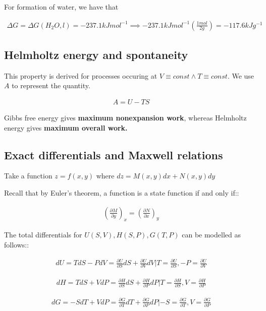\documentclass[12pt]{book}
\begin{document}
For formation of water, we have that

\begin{align*}
    \Delta G=\Delta G(H_2O,l)=-237.1kJmol^{-1}\implies -237.1kJmol^{-1}\left(\frac{1mol}{2g}\right)=-117.6kJg^{-1}
\end{align*}

\subsection*{Helmholtz energy and spontaneity}

This property is derived for processes occuring at $V\equiv const \land T\equiv const$. We use $A$ to represent the quantity.

\begin{align*}
    A=U-TS
\end{align*}

Gibbs free energy gives \textbf{maximum nonexpansion work}, whereas Helmholtz energy gives \textbf{maximum overall work.}

\subsection*{Exact differentials and Maxwell relations}

Take a function $z=f(x,y)$ where $dz=M(x,y)dx+N(x,y)dy$

Recall that by Euler's theorem, a function is a state function if and only if::

\begin{align*}
    \left(\frac{\partial M}{\partial y}\right)_x=\left(\frac{\partial N}{\partial x}\right)_y
\end{align*}

The total differentials for $U(S,V), H(S,P), G(T,P)$ can be modelled as follows::

\begin{align*}
    dU=TdS-PdV=\frac{\partial U}{\partial S}dS+\frac{\partial U}{\partial V}dV|T=\frac{\partial U}{\partial S}, -P=\frac{\partial U}{\partial V}
\end{align*}

\begin{align*}
    dH=TdS+VdP=\frac{\partial H}{\partial S}dS+\frac{\partial H}{\partial P}dP|T=\frac{\partial H}{\partial S},V=\frac{\partial H}{\partial P}
\end{align*}

\begin{align*}
    dG=-SdT+VdP=\frac{\partial G}{\partial T}dT+\frac{\partial G}{\partial P}dP|-S=\frac{\partial G}{\partial T}, V=\frac{\partial G}{\partial P}
\end{align*}
\end{document}

